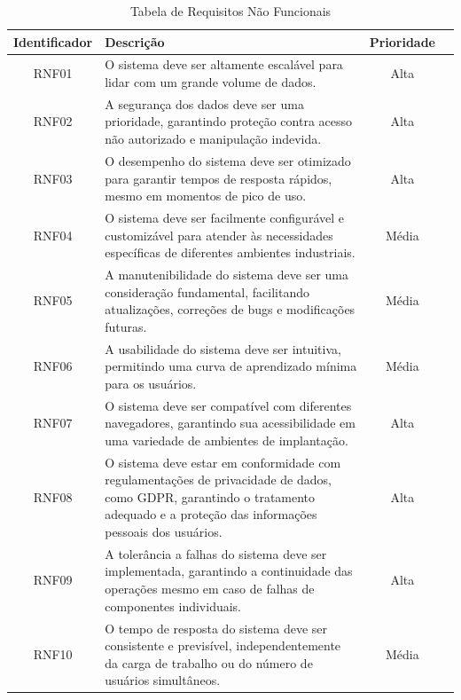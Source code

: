 \begin{table}[htbp]
\centering
\begin{tabularx}{\linewidth}{|c|X|c|c|} \hline
\rowcolor[HTML]{C0C0C0} 
    \textbf{Identificador} & \textbf{Descrição} & \textbf{Prioridade} \\
    \hline
    RNF01 & O sistema deve ser altamente escalável para lidar com um grande volume de dados. & Alta \\
    \hline
    RNF02 & A segurança dos dados deve ser uma prioridade, garantindo proteção contra acesso não autorizado e manipulação indevida. & Alta \\
    \hline
    RNF03 & O desempenho do sistema deve ser otimizado para garantir tempos de resposta rápidos, mesmo em momentos de pico de uso. & Alta \\
    \hline
    RNF04 & O sistema deve ser facilmente configurável e customizável para atender às necessidades específicas de diferentes ambientes industriais. & Média \\
    \hline
    RNF05 & A manutenibilidade do sistema deve ser uma consideração fundamental, facilitando atualizações, correções de bugs e modificações futuras. & Média \\
    \hline
    RNF06 & A usabilidade do sistema deve ser intuitiva, permitindo uma curva de aprendizado mínima para os usuários. & Média \\
    \hline
    RNF07 & O sistema deve ser compatível com diferentes navegadores, garantindo sua acessibilidade em uma variedade de ambientes de implantação. & Alta \\
    \hline
    RNF08 & O sistema deve estar em conformidade com regulamentações de privacidade de dados, como GDPR, garantindo o tratamento adequado e a proteção das informações pessoais dos usuários. & Alta \\
    \hline
    RNF09 & A tolerância a falhas do sistema deve ser implementada, garantindo a continuidade das operações mesmo em caso de falhas de componentes individuais. & Alta \\
    \hline
    RNF10 & O tempo de resposta do sistema deve ser consistente e previsível, independentemente da carga de trabalho ou do número de usuários simultâneos. & Média \\
    \hline
\end{tabularx}
\caption{Tabela de Requisitos Não Funcionais}
\label{tab:ReqNaoFuncional}
\end{table}

